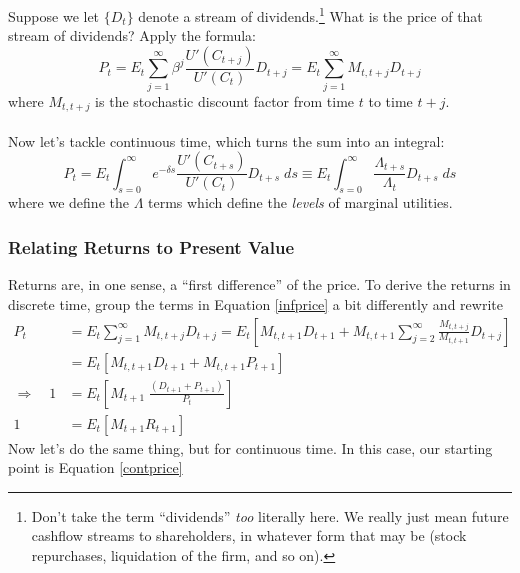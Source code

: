 \documentclass[a4paper,12pt]{scrartcl}
\begin{document}
Suppose we let $\{D_t\}$ denote a stream of 
dividends.\footnote{Don't take the term ``dividends'' \emph{too}
    literally here. We really just mean future cashflow streams
    to shareholders, in whatever form that may be 
    (stock repurchases, liquidation of the firm, and so on).}
What is the price of that stream of dividends? Apply
the formula:
\begin{equation}
    \label{infprice}
    P_t = E_t \sum^\infty_{j = 1} \beta^j 
	\frac{U'(C_{t+j})}{U'(C_{t})} D_{t+j} 
	= E_t \sum^\infty_{j = 1} M_{t, t+j} D_{t+j} 
\end{equation}
where $M_{t,t+j}$ is the stochastic discount factor
from time $t$ to time $t+j$.
\\
\\
Now let's tackle continuous time, which turns the
sum into an integral:
\begin{equation}
    \label{contprice}
    P_t = E_t \int^\infty_{s = 0}  e^{-\delta s} 
	\frac{U'(C_{t+s})}{U'(C_{t})} D_{t+s} \; ds
	\equiv E_t \int^\infty_{s = 0}   
	\frac{\Lambda_{t+s}}{\Lambda_{t}} D_{t+s} \; ds
\end{equation}
where we define the $\Lambda$ terms which define the
\emph{levels} of marginal utilities.

\subsubsection{Relating Returns to Present Value}

Returns are, in one sense, a ``first difference'' of 
the price. To derive the returns in discrete time,
group the terms in Equation \ref{infprice} a bit
differently and rewrite
\begin{align*}
    P_t &= E_t \sum^\infty_{j = 1} M_{t, t+j} D_{t+j} 
	= E_t\left[M_{t, t+1} D_{t+1}  + M_{t, t+1}
	\sum^\infty_{j = 2} \frac{M_{t, t+j}}{M_{t, t+1}}
	D_{t+j} \right] \\
    &= E_t\left[M_{t, t+1} D_{t+1}  + M_{t, t+1}
	P_{t+1} \right] \\
    \Rightarrow \quad 1 &= E_t\left[ M_{t+1} \; 
	\frac{(D_{t+1} + P_{t+1})}{P_t} \right] \\
    1 &= E_t\left[ M_{t+1} 
	R_{t+1} \right] 
\end{align*}
Now let's do the same thing, but for continuous time.
In this case, our starting point is Equation \ref{contprice}




\end{document}
